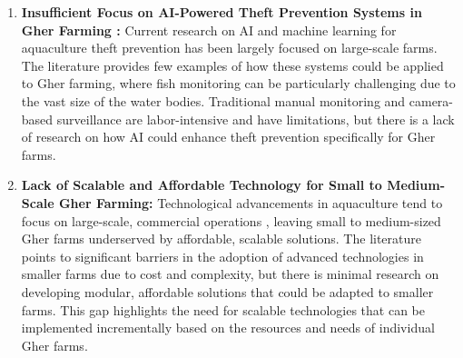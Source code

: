 \documentclass[conference]{IEEEtran}
\begin{document}
\begin{enumerate}
	\item \textbf{ Insufficient Focus on AI-Powered Theft Prevention Systems in Gher Farming : }
Current research on AI and machine learning for aquaculture theft prevention \cite{ref22} has been largely focused on large-scale farms. The literature provides few examples of how these systems could be applied to Gher farming, where fish monitoring can be particularly challenging due to the vast size of the water bodies. Traditional manual monitoring and camera-based surveillance are labor-intensive and have limitations, but there is a lack of research on how AI could enhance theft prevention specifically for Gher farms.
	
	\item \textbf{Lack of Scalable and Affordable Technology for Small to Medium-Scale Gher Farming: }
Technological advancements in aquaculture tend to focus on large-scale, commercial operations \cite{ref15}, leaving small to medium-sized Gher farms underserved by affordable, scalable solutions. The literature points to significant barriers in the adoption of advanced technologies in smaller farms due to cost and complexity, but there is minimal research on developing modular, affordable solutions that could be adapted to smaller farms. This gap highlights the need for scalable technologies that can be implemented incrementally based on the resources and needs of individual Gher farms.
\end{enumerate}
\end{document}
